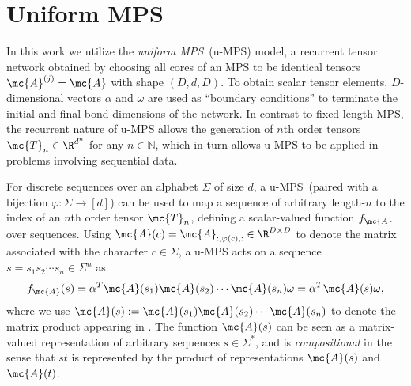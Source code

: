\section{Uniform MPS}
\label{sec:umps}

In this work we utilize the \emph{uniform MPS}~(u-MPS) model, a recurrent tensor network obtained by choosing all cores of an MPS to be identical tensors $\mc{A}^{(j)} = \mc{A}$ with shape $(D, d, D)$. To obtain scalar tensor elements, $D$-dimensional vectors $\alpha$ and $\omega$ are used as ``boundary conditions'' to terminate the initial and final bond dimensions of the network. In contrast to fixed-length MPS, the recurrent nature of u-MPS allows the generation of $n$th order tensors $\mc{T}_n\in\R^{d^n}$ for any $n\in\mathbb{N}$, which in turn allows u-MPS to be applied in problems involving sequential data. 

For discrete sequences over an alphabet $\Sigma$ of size $d$, a \mbox{u-MPS}\ (paired with a bijection $\varphi: \Sigma \to [d]$) can be used to map a sequence of arbitrary length-$n$ to the index of an $n$th order tensor $\mc{T}_n$, defining a scalar-valued function $f_{\mc{A}}$ over sequences. Using $\mc{A}(c) = \mc{A}_{:, \varphi(c), :} \in \R^{D\times D}$ to denote the matrix associated with the character $c\in\Sigma$, a u-MPS acts on a sequence $s = s_1s_2\cdots s_n \in \Sigma^n$ as
%
\begin{equation}
\label{eq:mps_amp}
f_{\mc{A}}(s) = \alpha^{T}\mc{A}(s_1)\mc{A}(s_2)\cdots \mc{A}(s_n)\omega = \alpha^{T}\mc{A}(s)\omega,
\end{equation}
%
where we use $\mc{A}(s) := \mc{A}(s_1)\mc{A}(s_2)\cdots \mc{A}(s_n)$ to denote the matrix product appearing in . The function $\mc{A}(s)$ can be seen as a matrix-valued representation of arbitrary sequences $s\in\Sigma^*$, and is \textit{compositional} in the sense that $st$ is represented by the product of representations $\mc{A}(s)$ and $\mc{A}(t)$.

